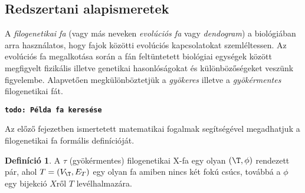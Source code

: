 \documentclass[a4paper,12pt,leqno, notitlepage]{article}%
\newcommand{\todo}[1]{\par\texttt{\textbf{todo: #1}}\par}
\theoremstyle{plain}
\theoremstyle{definition}
\newtheorem{defn}[thm]{Definíció} %
\begin{document}
\subsection{Redszertani alapismeretek}
\label{rendszertani}

A \emph{filogenetikai fa} (vagy más neveken \emph{evolúciós fa} vagy \emph{dendogram}) a biológiában arra használatos, hogy fajok közötti evolúciós kapcsolatokat szemléltessen.
Az evolúciós fa megalkotása során a fán feltüntetett biológiai egységek között megfigyelt fizikális illetve genetikai hasonlóságokat és különbözőségeket veszünk figyelembe.
Alapvetően megkülönböztetjük a \emph{gyökeres} illetve a \emph{gyökérmentes} filogenetikai fát.
\todo{Példa fa keresése}

Az előző fejezetben ismertetett matematikai fogalmak segítségével megadhatjuk a filogenetikai fa formális definícióját.
 
\begin{defn}\label{def:fgfa}
A $\tau$ (gyökérmentes) filogenetikai X-fa egy olyan $(\T, \phi)$ rendezett pár, ahol $T=(V_\T,E_T)$ egy olyan fa amiben nincs két fokú csúcs, továbbá a $\phi$ egy bijekció $X$ről $T$ levélhalmazára.
\end{defn}

{}


\end{document}
